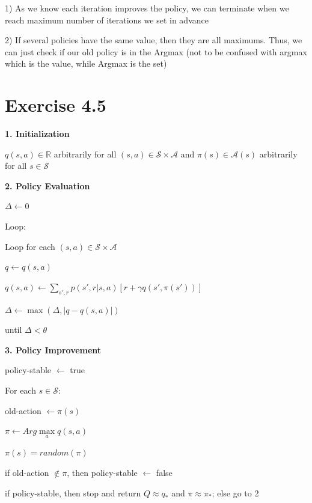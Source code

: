 \documentclass[12pt]{article}
\begin{document}
        1) As we know each iteration improves the policy, we can terminate when
        we reach maximum number of iterations we set in advance

        2) If several policies have the same value, then they are all maximums.
        Thus, we can just check if our old policy is in the Argmax (not to be
        confused with argmax which is the value, while Argmax is the set)

    \section{Exercise 4.5}
        \textbf{1. Initialization}

        \qquad $q(s, a) \in \mathbb{R}$ arbitrarily for all
        $(s,a) \in \mathcal{S} \times \mathcal{A}$ and $\pi(s) \in \mathcal{A}(s)$
        arbitrarily for all $s \in \mathcal{S}$

        \bigskip

        \textbf{2. Policy Evaluation}

        \qquad $\Delta \leftarrow 0$

        \qquad Loop:

        \qquad \qquad Loop for each $(s, a) \in \mathcal{S} \times \mathcal{A}$

        \qquad \qquad \qquad $q \leftarrow q(s, a)$

        \qquad \qquad \qquad $q(s, a) \leftarrow \sum\limits_{s',r} p(s',r|s,a)
        [r + \gamma q(s',\pi(s'))]$

        \qquad \qquad \qquad $\Delta \leftarrow \max(\Delta, |q - q(s, a)|)$

        \qquad until $\Delta < \theta$

        \bigskip

        \textbf{3. Policy Improvement}

        \qquad policy-stable $\leftarrow$ true

        \qquad For each $s \in \mathcal{S}$:

        \qquad \qquad old-action $\leftarrow \pi(s)$

        \qquad \qquad $\pi \leftarrow Arg\max\limits_a q(s,a)$

        \qquad \qquad $\pi(s) = random(\pi)$

        \qquad \qquad if old-action $\notin \pi$, then policy-stable $\leftarrow$ false

        \qquad if policy-stable, then stop and return $Q \approx q_*$
        and $\pi \approx \pi_*$; else go to 2
\end{document}
